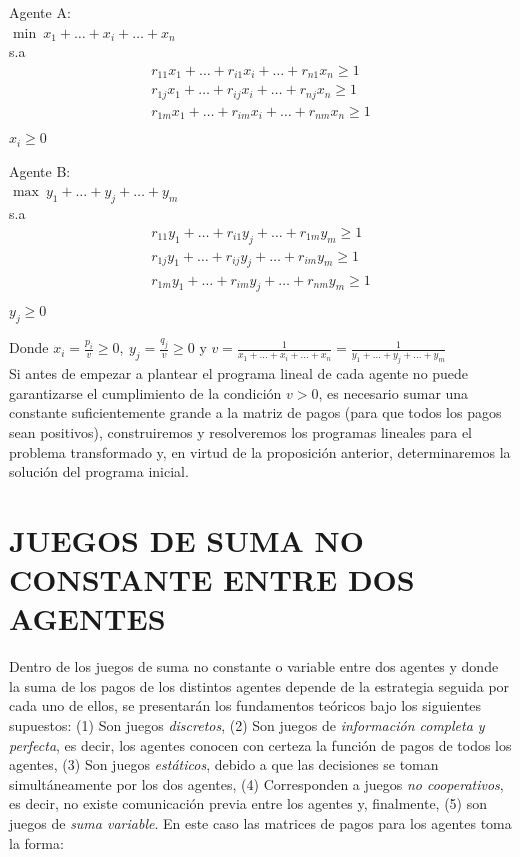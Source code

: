 \begin{proposicion}
\begin{minipage}{0.45\textwidth}
Agente A:\\
$\min \: x_1+\ldots+x_i+\ldots+x_n$\\
s.a 
    \begin{align*}
    r_{11}x_1+\ldots+r_{i1}x_i+\ldots+r_{n1}x_n  \geq 1\\
    r_{1j}x_1+\ldots+r_{ij}x_i+\ldots+r_{nj}x_n  \geq 1\\
    r_{1m}x_1+\ldots+r_{im}x_i+\ldots+r_{nm}x_n \geq 1\\
    \end{align*}
$x_i \geq 0$\\
\end{minipage}
\begin{minipage}{0.45\textwidth}
Agente B:\\
$\max \: y_1+\ldots+y_j+\ldots+y_m$\\
s.a 
    \begin{align*}
    r_{11}y_1+\ldots+r_{i1}y_j+\ldots+r_{1m}y_m  \geq 1\\
    r_{1j}y_1+\ldots+r_{ij}y_j+\ldots+r_{im}y_m  \geq 1\\
    r_{1m}y_1+\ldots+r_{im}y_j+\ldots+r_{nm}y_m \geq 1\\
    \end{align*}
$y_j \geq 0$ \\
\end{minipage}

Donde $x_i = \frac{p_i}{v} \geq 0, \: y_j = \frac{q_j}{v} \geq 0$ y $v=\frac{1}{x_1+\ldots+x_i+\ldots+x_n} = \frac{1}{y_1+\ldots+y_j+\ldots+y_m}$
\\
Si antes de empezar a plantear el programa lineal de cada agente no puede garantizarse el cumplimiento de la condición $v>0$, es necesario sumar  una constante suficientemente grande a la matriz de pagos (para que todos los pagos sean positivos), construiremos y resolveremos  los programas lineales para el problema transformado y, en virtud de la proposición anterior, determinaremos la solución del programa inicial.

\end{proposicion}

\section{JUEGOS DE SUMA NO CONSTANTE ENTRE DOS AGENTES}\label{Sec:Juegos_SNC2A}

Dentro de los juegos de suma no constante o variable entre dos agentes y donde la suma de los pagos de los distintos agentes depende de la estrategia seguida por cada uno de ellos, se presentarán los fundamentos teóricos bajo los siguientes supuestos:  (1) Son juegos \textit{discretos}, (2) Son juegos de \textit{información completa y perfecta}, es decir, los agentes conocen con certeza la función de pagos de todos los agentes, (3) Son juegos \textit{estáticos}, debido a que las decisiones se toman simultáneamente por los dos agentes, (4) Corresponden a juegos  \textit{no cooperativos}, es decir, no existe comunicación previa entre los agentes y, finalmente,  (5) son juegos de  \textit{suma variable}. En este caso las matrices de pagos para los agentes toma  la forma:

